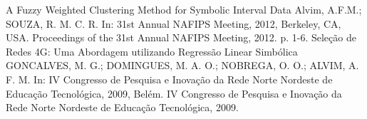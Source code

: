 \cvmetaevent
{A Fuzzy Weighted Clustering Method for Symbolic Interval Data}
{}
{Alvim, A.F.M.; SOUZA, R. M. C. R.}
{In: 31st Annual NAFIPS Meeting, 2012, Berkeley, CA, USA. Proceedings of the 31st Annual NAFIPS Meeting, 2012. p. 1-6. \href{https://ieeexplore.ieee.org/document/6291005}{\textcolor{maincol}{\faFile}} }
\cvmetaevent
{Seleção de Redes 4G: Uma Abordagem utilizando Regressão Linear Simbólica}
{}
{GONCALVES, M. G.; DOMINGUES, M. A. O.; NOBREGA, O. O.; ALVIM, A. F. M.}
{In: IV Congresso de Pesquisa e Inovação da Rede Norte Nordeste de Educação Tecnológica, 2009, Belém. IV Congresso de Pesquisa e Inovação da Rede Norte Nordeste de Educação Tecnológica, 2009.}
